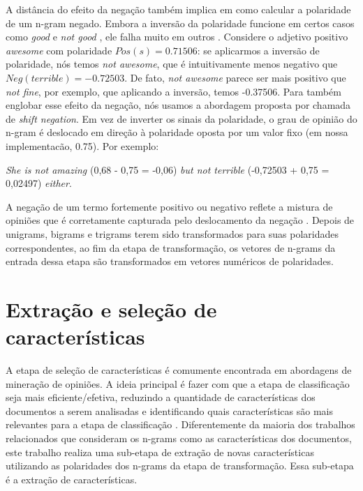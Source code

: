 A distância do efeito da negação também implica em como calcular a polaridade de um n-gram negado. Embora a inversão da polaridade funcione em certos casos como \textit{good} e \textit{not good} \cite{choi2008learning}, ele falha muito em outros \cite{liu2009review}. Considere o adjetivo positivo \textit{awesome} com polaridade $Pos(s) = 0.71506 $: se aplicarmos a inversão de polaridade, nós temos \textit{not awesome}, que é intuitivamente menos negativo que $Neg(\textit{terrible}) = -0.72503$. De fato, \textit{not awesome} parece ser mais positivo que \textit{not fine}, por exemplo, que aplicando a inversão, temos -0.37506. Para também englobar esse efeito da negação, nós usamos a abordagem proposta por \cite{taboada2011lexicon} chamada de \textit{shift negation}. Em vez de inverter os sinais da polaridade, o grau de opinião do n-gram é deslocado em direção à polaridade oposta por um valor fixo (em nossa implementacão, 0.75). Por exemplo:

\begin{example}
\textit{She is not amazing} (0,68 - 0,75 = -0,06) \textit{but not terrible} (-0,72503 + 0,75 = 0,02497) \textit{either}.
\label{ex:shift_1}
\end{example}

A negação de um termo fortemente positivo ou negativo reflete a mistura de opiniões que é corretamente capturada pelo deslocamento da negação \cite{taboada2011lexicon}. Depois de unigrams, bigrams e trigrams terem sido transformados para suas polaridades correspondentes, ao fim da etapa de transformação, os vetores de n-grams da entrada dessa etapa são transformados em vetores numéricos de polaridades.  

\section{Extração e seleção de características}

A etapa de seleção de características é comumente encontrada em abordagens de mineração de opiniões. A ideia principal é fazer com que a etapa de classificação seja mais eficiente/efetiva, reduzindo a quantidade de características dos documentos a serem analisadas e identificando quais características são mais relevantes para a etapa de classificação \cite{moraes2012document}. Diferentemente da maioria dos trabalhos relacionados que consideram os n-grams como as características dos documentos, este trabalho realiza uma sub-etapa de extração de novas características utilizando as polaridades dos n-grams da etapa de transformação. Essa sub-etapa é a extração de características.

